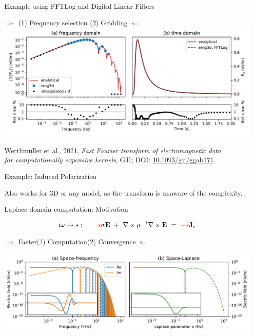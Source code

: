 \documentclass[xcolor=svgnames, usepdftitle=false, aspectratio=169]{beamer}
\newcommand{\bdra}{\ensuremath{\boldsymbol \Rightarrow }~}
\newcommand{\bdla}{\ensuremath{\boldsymbol \Leftarrow }~}
\newcommand{\mr}[1]{\mathrm{#1}}
\begin{document}
\begin{frame}
  {Example using FFTLog and Digital Linear Filters}
  \centering

  \bdra \quad (1) Frequency selection \quad (2) Gridding \quad \bdla\\[.5cm]

  \includegraphics[width=.8\textwidth]{fullspace}


  {\raggedright\small
  Werthmüller et al., 2021, \emph{Fast Fourier transform of electromagnetic
  data\\for computationally expensive kernels}, GJI; DOI:
  \href{https://doi.org/10.1093/gji/ggab171}{10.1093/gji/ggab171}.\\
  }


\end{frame}


\begin{frame}
  {Example: Induced Polarization}

  Also works for 3D or any model, as the transform is unaware of the
  complexity.

\end{frame}


\begin{frame}  %
  {Laplace-domain computation: Motivation}
  \centering
  \vspace{-.5cm}

  $$
    \mr{i}\omega \rightarrow s:
    \qquad
    \textcolor{red}{s} \sigma \mathbf{E} \ +\
    \nabla \times \mu^{-1} \nabla \times \mathbf{E}
    \ =\ -\textcolor{red}{s} \mathbf{J}_\mathrm{s}
  $$

  \bdra Faster\quad (1) Computation\quad (2) Convergence \quad \bdla\\
  \vspace{.5cm}

  \includegraphics[width=\textwidth]{motivationcomparison}

\end{frame}
\end{document}
